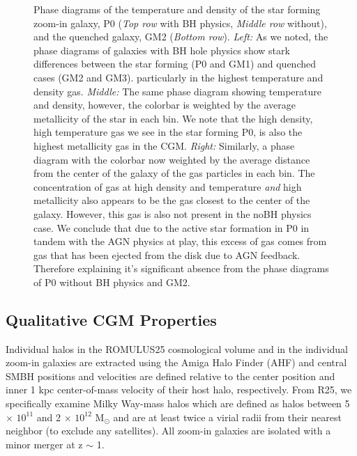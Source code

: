 \documentclass[]{emulateapj}
\begin{document}
\begin{figure}[h!]
\caption[]{Phase diagrams of the temperature and density of the star forming zoom-in galaxy, P0 (\textit{Top row} with BH physics, \textit{Middle row} without), and the quenched galaxy, GM2 (\textit{Bottom row}). \textit{Left:} As we noted, the phase diagrams of galaxies with BH hole physics show stark differences between the star forming (P0 and GM1) and quenched cases (GM2 and GM3).  particularly in the highest temperature and density gas. \textit{Middle:} The same phase diagram showing temperature and density, however, the colorbar is weighted by the average metallicity of the star in each bin. We note that the high density, high temperature gas we see in the star forming P0, is also the highest metallicity gas in the CGM. \textit{Right:} Similarly, a phase diagram with the colorbar now weighted by the average distance from the center of the galaxy of the gas particles in each bin. The concentration of gas at high density and temperature \textit{and} high metallicity also appears to be the gas closest to the center of the galaxy. However, this gas is also not present in the noBH physics case. We conclude that due to the active star formation in P0 in tandem with the AGN physics at play, this excess of gas comes from gas that has been ejected from the disk due to AGN feedback. Therefore explaining it's significant absence from the phase diagrams of P0 without BH physics and GM2.}
\label{phasediagrams}
\end{figure}



\subsection{Qualitative CGM Properties}

Individual halos in the ROMULUS25 cosmological volume and in the individual zoom-in galaxies are extracted using the Amiga Halo Finder (AHF) \citep{Knollmann2009} and central SMBH positions and velocities are defined relative to the center position and inner 1 kpc center-of-mass velocity of their host halo, respectively. From R25, we specifically examine Milky Way-mass halos which are defined as halos between 5 $\times$ $10^{11}$ and 2 $\times$ $10^{12}$ M$_{\odot}$ and are at least twice a virial radii from their nearest neighbor (to exclude any satellites). All zoom-in galaxies are isolated with a minor merger at z $\sim$ 1.  
\end{document}

